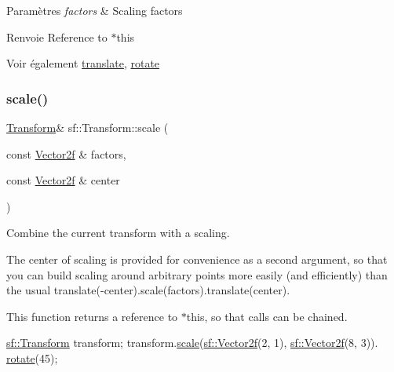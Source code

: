 \begin{DoxyParams}{Paramètres}
{\em factors} & Scaling factors\\
\hline
\end{DoxyParams}
\begin{DoxyReturn}{Renvoie}
Reference to $\ast$this
\end{DoxyReturn}
\begin{DoxySeeAlso}{Voir également}
\hyperlink{classsf_1_1Transform_ab54f6c8070cc05e2afcb3145fbf4395a}{translate}, \hyperlink{classsf_1_1Transform_a3e548c3c9e3fb9d4bd43cf852669e555}{rotate} 
\end{DoxySeeAlso}
\mbox{\label{classsf_1_1Transform_a9198da375173127901f3095e0165ee1b}} 
\subsubsection{\texorpdfstring{scale()}{scale()}\hspace{0.1cm}{\footnotesize\ttfamily [4/4]}}
{\footnotesize\ttfamily \hyperlink{classsf_1_1Transform}{Transform}\& sf\+::\+Transform\+::scale (\begin{DoxyParamCaption}\item[{const \hyperlink{classsf_1_1Vector2}{Vector2f} \&}]{factors,  }\item[{const \hyperlink{classsf_1_1Vector2}{Vector2f} \&}]{center }\end{DoxyParamCaption})}



Combine the current transform with a scaling. 

The center of scaling is provided for convenience as a second argument, so that you can build scaling around arbitrary points more easily (and efficiently) than the usual translate(-\/center).scale(factors).translate(center).

This function returns a reference to $\ast$this, so that calls can be chained. 
\begin{DoxyCode}
\hyperlink{classsf_1_1Transform}{sf::Transform} transform;
transform.\hyperlink{classsf_1_1Transform_a3f46af807f69d74120fb836334268671}{scale}(\hyperlink{classsf_1_1Vector2}{sf::Vector2f}(2, 1), \hyperlink{classsf_1_1Vector2}{sf::Vector2f}(8, 3)).
      \hyperlink{classsf_1_1Transform_a3e548c3c9e3fb9d4bd43cf852669e555}{rotate}(45);
\end{DoxyCode}



